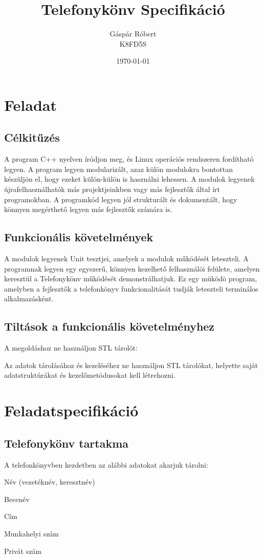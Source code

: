 \documentclass[11pt, letterpaper, openany, oneside]{book}
\title{\textbf{Telefonykönv Specifikáció}}
\author{\LARGE Gáspár Róbert \vspace{4px} \\ K8FD5S}
\date{\today}
\begin{document}
\maketitle

\tableofcontents

\chapter{Feladat}

\section{Célkitűzés}

A program C++ nyelven íródjon meg, és Linux operációs rendszeren fordítható legyen. A program legyen modularizált, azaz külön modulokra bontottan készüljön el, hogy ezeket külön-külön is használni lehessen. A modulok legyenek újrafelhasználhatók más projektjeinkben vagy más fejlesztők által írt programokban. A programkód legyen jól strukturált és dokumentált, hogy könnyen megérthető legyen más fejlesztők számára is.

\section{Funkcionális követelmények}

A modulok legyenek Unit tesztjei, amelyek a modulok működését leteszteli. A programnak legyen egy egyszerű, könnyen kezelhető felhasználói felülete, amelyen keresztül a Telefonykönv működését demonstrálhatjuk. Ez egy müködö program, amelyben a fejlesztők a telefonkönyv funkcionalitását tudják leteszteli terminálos alkalmazásként.

\section{Tiltások a funkcionális követelményhez}
A megoldáshoz ne használjon STL tárolót:

Az adatok tárolásához és kezeléséhez ne használjon STL tárolókat, helyette saját adatstruktúrákat és kezelőmetódusokat kell létrehozni.

\chapter{Feladatspecifikáció}

\section{Telefonykönv tartakma}
A telefonkönyvben kezdetben az alábbi adatokat akarjuk tárolni:
\vspace{5px}
\begin{compactitem}
    \item Név (vezetéknév, keresztnév)
    \item Becenév
    \item Cím
    \item Munkahelyi szám
    \item Privát szám
\end{compactitem}
\end{document}

